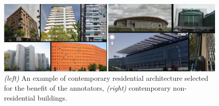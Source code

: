 \begin{figure}[t] %
	 \centering
	 \includegraphics[width=12cm]{imgs/modern-.jpg} 
	 \caption{\emph{(left)} An example of contemporary residential architecture selected for the benefit of the annotators, \emph{(right)} contemporary non-residential buildings.}
	 \label{fig:residential_nonresidential}
\end{figure}